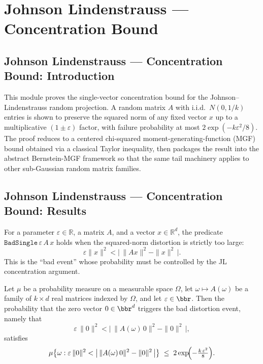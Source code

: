 \section{Johnson Lindenstrauss --- Concentration Bound}
\subsection*{Johnson Lindenstrauss --- Concentration Bound: Introduction}

This module proves the single-vector concentration bound for the
Johnson--Lindenstrauss random projection.  A random matrix $A$ with i.i.d.\
$N(0,1/k)$ entries is shown to preserve the squared norm of any fixed vector $x$
up to a multiplicative $(1\pm\varepsilon)$ factor, with failure probability at
most $2\exp(-k\varepsilon^2/8)$.  The proof reduces to a centered chi-squared
moment-generating-function (MGF) bound obtained via a classical Taylor
inequality, then packages the result into the abstract Bernstein-MGF framework
so that the same tail machinery applies to other sub-Gaussian random matrix
families.

\subsection*{Johnson Lindenstrauss --- Concentration Bound: Results}

\begin{definition}
\label{BadSingle}
\leanok
For a parameter $\varepsilon\in\mathbb{R}$, a matrix $A$, and a vector
$x\in\mathbb{R}^d$, the predicate $\texttt{BadSingle}\,\varepsilon\,A\,x$ holds when
the squared-norm distortion is strictly too large:
\[
  \varepsilon \|x\|^2 < \bigl|\,\|Ax\|^2 - \|x\|^2\,\bigr|.
\]
This is the ``bad event'' whose probability must be controlled by the JL
concentration argument.
\end{definition}

\begin{lemma}
\label{concentration_zero}
\leanok
{}
Let $\mu$ be a probability measure on a measurable space $\Omega$, let $\omega \mapsto
A(\omega)$ be a family of $k \times d$ real matrices indexed by $\Omega$, and let
$\varepsilon \in \bbr$. Then the probability that the zero vector $0 \in \bbr^d$
triggers the bad distortion event, namely that
\[
  \varepsilon\,\|0\|^2 < \bigl|\,\|A(\omega)\,0\|^2 - \|0\|^2\,\bigr|,
\]
satisfies
\[
\mu\bigl\{\omega : \varepsilon\,\|0\|^2 < \bigl|\,\|A(\omega)\,0\|^2 -
\|0\|^2\,\bigr|\bigr\}
    \;\le\; 2\exp\!\Bigl(-\tfrac{k\,\varepsilon^2}{8}\Bigr).
\]
\end{lemma}

